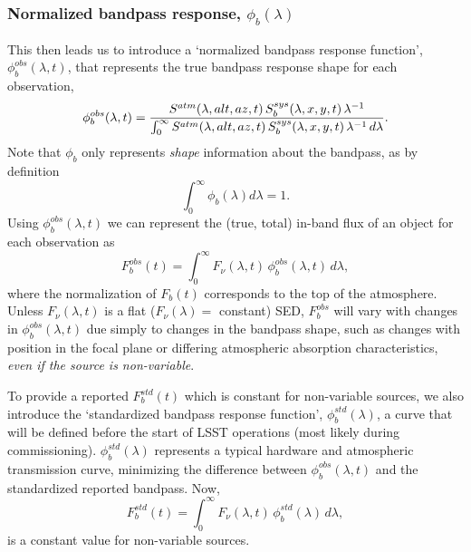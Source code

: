 \documentclass[12pt,preprint]{aastex}
\begin{document}
\subsubsection{Normalized bandpass response, $\phi_b(\lambda)$}
\label{sec:phi}

This then leads us to introduce a `normalized bandpass response
function', $\phi_b^{obs}(\lambda,t)$, that represents the true
bandpass response shape for each observation,
\begin{equation}
\label{eqn:PhiDef}
   \phi_b^{obs}(\lambda,t) =  {
     {S^{atm}(\lambda,alt,az,t)\, S_b^{sys}(\lambda,x,y,t) \,
       \lambda^{-1}} \over
     \int_0^\infty { {S^{atm}(\lambda,alt,az,t) \,
         S_b^{sys}(\lambda,x,y,t) \, \lambda^{-1}} \,d\lambda}}.
\end{equation}
Note that $\phi_b$ only represents {\it shape} information about the
bandpass, as by definition
\begin{equation}
\int_0^\infty {\phi_b(\lambda)  d\lambda}=1. 
\end{equation}
Using $\phi_b^{obs}(\lambda, t)$ we can represent the (true, total)
in-band flux of an object for each observation as
\begin{equation}
\label{eqn:Fb}
F_b^{obs}(t) = \int_0^\infty {F_\nu(\lambda,t) \,\phi_b^{obs}(\lambda,t) \, d\lambda},
\end{equation}
where the normalization of $F_b(t)$ corresponds to the top of the
atmosphere. Unless $F_\nu(\lambda,t)$ is a flat ($F_\nu(\lambda)=$
constant) SED, $F_b^{obs}$ will vary with changes in
$\phi_b^{obs}(\lambda,t)$ due simply to changes in the bandpass shape,
such as changes with position in the focal plane or differing
atmospheric absorption characteristics, {\it even if the source is
non-variable}.

To provide a reported $F_b^{std}(t)$ which is constant for
non-variable sources, we also introduce the `standardized bandpass response
function', $\phi_b^{std}(\lambda)$, a curve that will be defined before
the start of LSST operations (most likely during
commissioning). $\phi_b^{std}(\lambda)$ represents a typical hardware
and atmospheric transmission curve, minimizing the difference between
$\phi_b^{obs}(\lambda,t)$ and the standardized reported bandpass.
Now, 
\begin{equation}
F_b^{std}(t) = \int_0^{\infty} {F_\nu(\lambda,t) \,
  \phi_b^{std}(\lambda) \, d\lambda}, 
\end{equation}
is a constant value for non-variable sources. 
\end{document}
